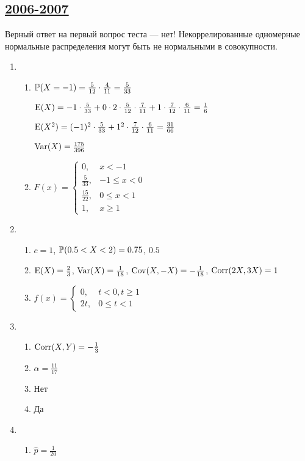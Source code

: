 \subsection[2006-2007]{\hyperref[sec:kr_03_2006_2007]{2006-2007}}
\label{sec:sol_kr_03_2006_2007}

Верный ответ на первый вопрос теста — нет! Некоррелированные одномерные нормальные распределения
могут быть не нормальными в совокупности.

\begin{enumerate}
\item
\begin{enumerate}
\item $\P(X=-1) = \frac{5}{12}\cdot\frac{4}{11} = \frac{5}{33}$

$\E(X) = -1 \cdot \frac{5}{33} + 0 \cdot 2 \cdot \frac{5}{12}\cdot\frac{7}{11} + 1 \cdot \frac{7}{12}\cdot\frac{6}{11} = \frac{1}{6}$

$\E(X^2) = (-1)^2 \cdot \frac{5}{33} + 1^2 \cdot \frac{7}{12}\cdot\frac{6}{11} = \frac{31}{66}$

$\Var(X) = \frac{175}{396}$
\item $F(x) = \begin{cases}
0, & x < -1 \\
\frac{5}{33}, & -1 \leq x < 0 \\
\frac{15}{22}, & 0 \leq x < 1 \\
1, & x \geq 1
\end{cases}$
\end{enumerate}
\item
\begin{enumerate}
\item $c=1$, $\P(0.5<X<2) = 0.75$, $0.5$
\item $\E(X) = \frac{2}{3}$, $\Var(X) = \frac{1}{18}$, $\Cov(X,-X) = - \frac{1}{18}$,
$\Corr(2X,3X) = 1$
\item $f(x) = \begin{cases}
0, & t < 0, t \geq 1 \\
2t, & 0 \leq t < 1
\end{cases}$
\end{enumerate}
\item
\begin{enumerate}
\item $\Corr(X,Y)=-\frac{1}{3}$
\item $\alpha=\frac{11}{17}$
\item Нет
\item Да
\end{enumerate}
\item
\begin{enumerate}
\item $\hat{p} = \frac{1}{20}$


\end{enumerate}
\end{enumerate}
